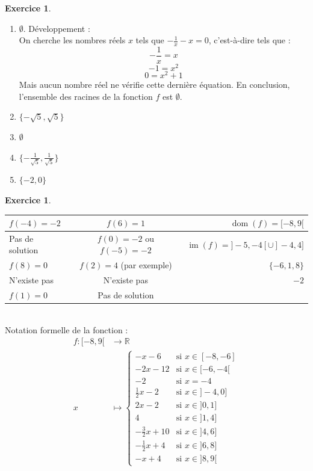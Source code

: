 \documentclass[a4paper,13pt]{scrreprt}
\theoremstyle{plain}
\theoremstyle{definition}
\newtheorem{exo}[subsection]{Exercice}
\newcommand{\rr}{\mathbb{R}}
\DeclareMathOperator{\dom}{dom}
\DeclareMathOperator{\im}{im}
\begin{document}
\begin{exo} ~~\\
	\begin{enumerate}
		\item $\emptyset$. Développement : \\
		On cherche les nombres réels $x$ tels que $-\frac{1}{x} - x=0$, c'est-à-dire tels que :
		$$-\frac{1}{x}=x$$
		$$-1=x^2$$
		$$0=x^2 +1$$
		Mais aucun nombre réel ne vérifie cette dernière équation. En conclusion, l'ensemble des racines de la fonction $f$ est $\emptyset$.
		\item $\{-\sqrt{5},\sqrt{5}\}$
		\item $\emptyset$
		\item $\{-\frac{1}{\sqrt{5}},\frac{1}{\sqrt{5}}\}$
		\item $\{-2,0\}$
	\end{enumerate}
\end{exo}

\begin{exo} ~~\\
	\begin{center}
		\begin{tabular}{|l|c|r|}
			\hline
			$f(-4)=-2$ & $f(6)=1$ & $\dom (f) = [-8,9[$ \\
			\hline
			Pas de solution & $f(0)=-2$ ou $f(-5)=-2$ & $\im (f) =]-5,-4[ \cup ]-4,4]$\\
			\hline
			$f(8)=0$ & $f(2)=4$ (par exemple) & $\{-6,1,8\}$ \\
			\hline
			N'existe pas & N'existe pas & $-2$ \\
			\hline
			$f(1)=0$ & Pas de solution &  \\
			\hline
		\end{tabular}
	\end{center} ~~\\
	Notation formelle de la fonction :
	\begin{align*}
	f : [-8,9[ &\to \rr \\
	x &\mapsto \begin{cases}
	-x-6&\text{si $x \in [-8,-6]$}\\
	-2x-12&\text{si $x \in [-6,-4[$}\\
	-2&\text{si $x =-4$}\\
	\frac{1}{2}x-2&\text{si $x \in ]-4,0]$}\\
	2x-2&\text{si $x \in ]0,1]$}\\
	4&\text{si $x \in ]1,4]$}\\
	-\frac{3}{2}x +10 &\text{si $x \in ]4,6]$}\\
	-\frac{1}{2}x +4 &\text{si $x \in ]6,8]$}\\
	-x +4 &\text{si $x \in ]8,9[$}
	\end{cases}
	\end{align*}
\end{exo}
\end{document}
